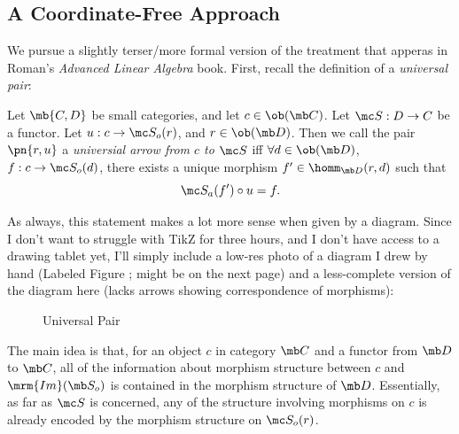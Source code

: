 \documentclass{fkbook}
\theoremstyle{snazzydefinition}
\begin{document}
  \subsection{A Coordinate-Free Approach}
  We pursue a slightly terser/more formal version of the treatment
  that apperas in Roman's \emph{Advanced Linear Algebra} book. First,
  recall the definition of a \emph{universal pair}:
  \begin{definition}
    Let $\mb{C,D}$ be small categories, and let $c \in \ob(\mb C)$.
    Let $\mc S : D \to C$ be a functor. Let $u : c \to \mc S_{o} (r)$,
    and $r \in \ob(\mb D)$. Then we call the pair $\pn{r,u}$ a
    \emph{universial arrow from $c$ to $\mc S$} iff $\forall d \in
    \ob(\mb D)$, $f : c \to \mc S_o(d)$, there exists a unique
    morphism $f' \in \homm_{\mb D}(r,d)$ such that
    \[
      \mc S_{a}(f') \circ u = f.
    \]
  \end{definition}
  As always, this statement makes a lot more sense when given by a
  diagram. Since I don't want to struggle with TikZ for three hours,
  and I don't have access to a drawing tablet yet, I'll simply include
  a low-res photo of a diagram I drew by hand (Labeled Figure
  ; might be on the next page) and a
  less-complete version of the diagram here (lacks arrows showing
  correspondence of morphisms):
  \begin{figure}[h]
    \centering
    \caption{Universal Pair}
    \label{fig:upair}
  \end{figure}

  The main idea is that, for an object $c$ in category $\mb C$ and a
  functor from $\mb D$ to $\mb C$, all of the information about
  morphism structure between $c$ and $\mrm{Im}(\mb S_o)$ is contained
  in the morphism structure of $\mb D$. Essentially, as far as $\mc S$
  is concerned, any of the structure involving morphisms on $c$ is
  already encoded by the morphism structure on $\mc S_o(r)$.
\end{document}
